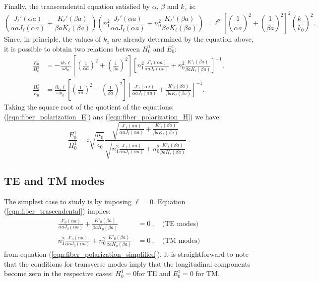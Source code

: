 Finally, the transcendental equation satisfied by  $\alpha$, $\beta$ and $k_z$ is:
\begin{equation}
	\left( \frac{J_\ell'(\alpha a)}{\alpha a J_\ell(\alpha a)} + \frac{K_\ell'(\beta a)}{\beta a K_\ell(\beta a)} \right)\left( n_1^2\frac{J_\ell'(\alpha a)}{\alpha a J_\ell(\alpha a)} + n_0^2\frac{K_\ell'(\beta a)}{\beta a K_\ell(\beta a)} \right) = \ell^2 \left[ \left(\frac{1}{\alpha a}\right)^2 + \left(\frac{1}{\beta a}\right)^2 \right]^2 \left( \frac{k_z}{k_0} \right)^2 . \label{eqn:fiber_trascendental}
\end{equation}
Since, in principle, the values of $k_z$ are already determined by the equation above, it is possible to obtain two relations between $H_0^1$ and $E_0^1$:
\begin{align}
\frac{E_0^1}{H_0^1} &=  -\frac{i k_z \ell}{\omega\epsilon_0}\left[ \left(\frac{1}{\alpha a}\right)^2 + \left(\frac{1}{\beta a}\right)^2 \right]  \left[ n_1^2 \frac{J'_\ell(\alpha a)}{\alpha a J_\ell(\alpha a)} + n_0^2 \frac{K'_\ell(\beta a)}{\beta a K_\ell(\beta a)} \right]^{-1} \label{eqn:fiber_polarization_E},
\\
\frac{H_0^1}{E_0^1} &=  \frac{i k_z \ell}{ \omega\mu_0}\left[ \left(\frac{1}{\alpha a}\right)^2 + \left(\frac{1}{\beta a}\right)^2 \right]  \left[ \frac{J'_\ell(\alpha a)}{\alpha a J_\ell(\alpha a)} + \frac{K'_\ell(\beta a)}{\beta a K_\ell(\beta a)} \right]^{-1} \label{eqn:fiber_polarization_H}.
\end{align}
Taking the square root of the quotient of the equations: (\ref{eqn:fiber_polarization_E}) ans (\ref{eqn:fiber_polarization_H}) we have:
\begin{equation}
	\frac{E_0^1}{H_0^1} = i \sqrt{\frac{\mu_0}{\epsilon_0}} \frac{\sqrt{ \frac{J'_\ell(\alpha a)}{\alpha a J_\ell(\alpha a)} + \frac{K'_\ell(\beta a)}{\beta a K_\ell(\beta a)}}}{\sqrt{n_1^2 \frac{J'_\ell(\alpha a)}{\alpha a J_\ell(\alpha a)} + n_0^2 \frac{K'_\ell(\beta a)}{\beta a K_\ell(\beta a)}}} \ .
	\label{eqn:fiber_polarization_simplified}
\end{equation}
\subsection{TE and TM modes}
The simplest case to study is by imposing $\ell = 0$. Equation (\ref{eqn:fiber_trascendental}) implies:
\begin{align*}
	\frac{J'_{0}(\alpha a)}{\alpha a J_0(\alpha a)} + \frac{K'_0(\beta a)}{\beta a K_0(\beta a)}&=  0 \ , \quad \text{(TE modes)}
	\\
	n_1^2\frac{J'_{0}(\alpha a)}{\alpha a J_0(\alpha a)} + n_0^2 \frac{K'_0(\beta a)}{\beta a K_0(\beta a)} &= 0 \ , \quad \text{(TM modes)}
\end{align*}
from equation (\ref{eqn:fiber_polarization_simplified}), it is straightforward to note that the conditions for transverse modes imply that the longitudinal components become zero in the respective cases: $H_0^1 = 0$for TE and $E_0^1 = 0$ for TM.

